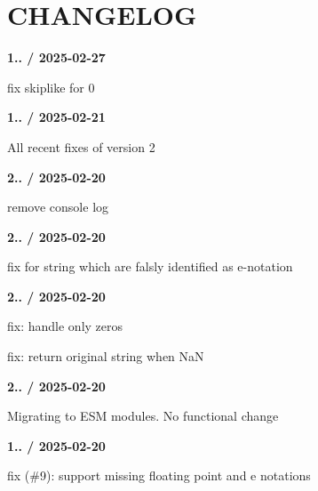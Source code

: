 \chapter{CHANGELOG}
\hypertarget{md_node__modules_2strnum_2_c_h_a_n_g_e_l_o_g}{}\label{md_node__modules_2strnum_2_c_h_a_n_g_e_l_o_g}
{\bfseries{1.. / 2025-\/02-\/27}}
\begin{DoxyItemize}
\item fix skiplike for 0
\end{DoxyItemize}

{\bfseries{1.. / 2025-\/02-\/21}}
\begin{DoxyItemize}
\item All recent fixes of version 2
\end{DoxyItemize}

{\bfseries{2.. / 2025-\/02-\/20}}
\begin{DoxyItemize}
\item remove console log
\end{DoxyItemize}

{\bfseries{2.. / 2025-\/02-\/20}}
\begin{DoxyItemize}
\item fix for string which are falsly identified as e-\/notation
\end{DoxyItemize}

{\bfseries{2.. / 2025-\/02-\/20}}
\begin{DoxyItemize}
\item fix\+: handle only zeros
\item fix\+: return original string when NaN
\end{DoxyItemize}

{\bfseries{2.. / 2025-\/02-\/20}}
\begin{DoxyItemize}
\item Migrating to ESM modules. No functional change
\end{DoxyItemize}

{\bfseries{1.. / 2025-\/02-\/20}}
\begin{DoxyItemize}
\item fix (\#9)\+: support missing floating point and e notations 
\end{DoxyItemize}